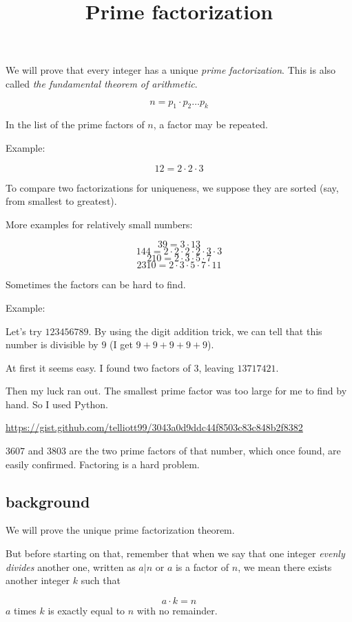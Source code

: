 \documentclass[11pt, oneside]{article}
\title{Prime factorization}
\date{}
\begin{document}
\maketitle
\Large

We will prove that every integer has a unique \emph{prime factorization}.  This is also called \emph{the fundamental theorem of arithmetic}.

\[ n = p_1 \cdot p_2 \dots p_k \]

In the list of the prime factors of $n$, a factor may be repeated.

Example:

\[ 12 = 2 \cdot 2 \cdot 3 \]

To compare two factorizations for uniqueness, we suppose they are sorted (say, from smallest to greatest).

More examples for relatively small numbers:

\[ 39 = 3 \cdot 13 \]
\[ 144 = 2 \cdot 2 \cdot 2 \cdot 2 \cdot 3 \cdot 3 \]
\[ 210 = 2 \cdot 3 \cdot 5 \cdot 7 \]
\[ 2310 = 2 \cdot 3 \cdot 5 \cdot 7 \cdot 11 \]

Sometimes the factors can be hard to find.

Example:

Let's try $123456789$.  By using the digit addition trick, we can tell that this number is divisible by $9$ (I get $9 + 9 + 9 + 9 + 9$).

At first it seems easy.  I found two factors of $3$, leaving $13717421$.

Then my luck ran out.  The smallest prime factor was too large for me to find by hand.  So I used Python.

\url{https://gist.github.com/telliott99/3043a0d9ddc44f8503c83c848b2f8382}

$3607$ and $3803$ are the two prime factors of that number, which once found, are easily confirmed.  Factoring is a hard problem.

\subsection*{background}

We will prove the unique prime factorization theorem.

But before starting on that, remember that when we say that one integer \emph{evenly divides} another one, written as $a|n$ or $a$ is a factor of $n$, we mean there exists another integer $k$ such that

\[ a \cdot k = n \]
$a$ times $k$ is exactly equal to $n$ with no remainder.
\end{document}
